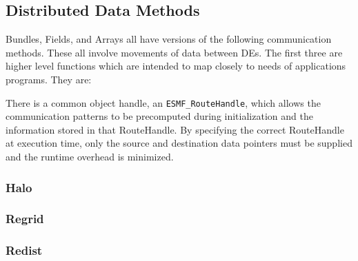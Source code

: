 \subsection{Distributed Data Methods}

Bundles, Fields, and Arrays all have versions of the following
communication methods.  These all involve movements of data between
DEs.  The first three are higher level functions which are intended to
map closely to needs of applications programs.  They are:

There is a common object handle, an {\tt ESMF\_RouteHandle}, which
allows the communication patterns to be precomputed during 
initialization and the information stored in that RouteHandle.
By specifying the correct RouteHandle at execution time, only
the source and destination data pointers must be supplied and the
runtime overhead is minimized.

\subsubsection{Halo}


\subsubsection{Regrid}



\subsubsection{Redist}


